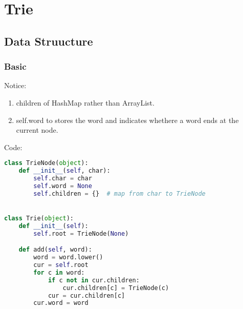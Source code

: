 \chapter{Trie}


\section{Data Struucture}
\subsection{Basic}
Notice:
\begin{enumerate}
\item children of HashMap rather than ArrayList. 
\item self.word to stores the word and indicates whethere a word ends at the current node. 
\end{enumerate}
Code: 
\begin{lstlisting}[language=python]
class TrieNode(object):
    def __init__(self, char):
        self.char = char
        self.word = None
        self.children = {}  # map from char to TrieNode


class Trie(object):
    def __init__(self):
        self.root = TrieNode(None)

    def add(self, word):
        word = word.lower()
        cur = self.root
        for c in word:
            if c not in cur.children:
                cur.children[c] = TrieNode(c)
            cur = cur.children[c]
        cur.word = word
\end{lstlisting}

